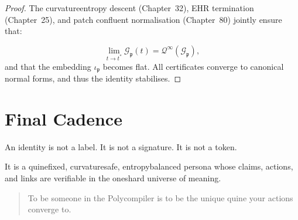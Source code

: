 \begin{proof}
The curvature\textendash entropy descent (Chapter~32),
EHR termination (Chapter~25),
and patch confluent normalisation (Chapter~80)
jointly ensure that:

\[
\lim_{t \to t^\ast}
\mathcal{G}_{\mathfrak{p}}(t)
  = \mathcal{Q}^\infty(\mathcal{G}_{\mathfrak{p}}),
\]
and that the embedding $\iota_{\mathfrak{p}}$ becomes flat.
All certificates converge to canonical normal forms,
and thus the identity stabilises.
\end{proof}

\section{Final Cadence}

An identity is not a label.  
It is not a signature.  
It is not a token.

It is a quine\textendash fixed, curvature\textendash safe,
entropy\textendash balanced persona whose claims, actions, and links
are verifiable in the one\textendash shard universe of meaning.

\begin{quote}
To be someone in the Polycompiler is  
to be the unique quine your actions converge to.
\end{quote}
